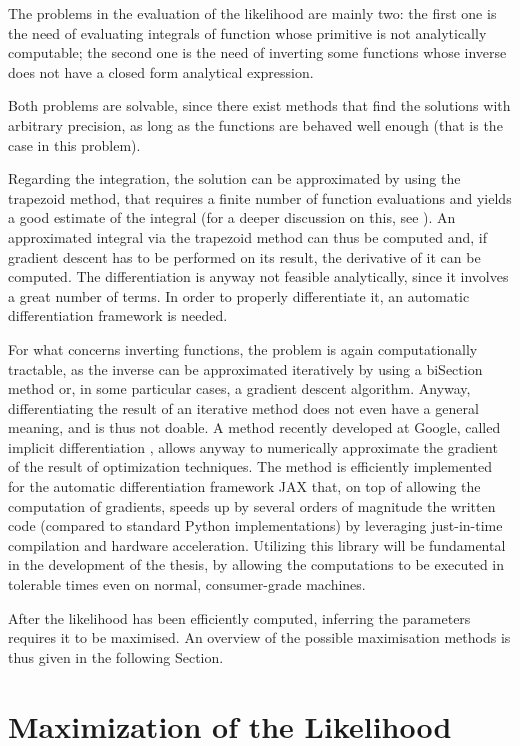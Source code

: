 The problems in the evaluation of the likelihood are mainly two:
the first one is the need of evaluating integrals of function whose primitive is not analytically computable;
the second one is the need of inverting some functions whose inverse does not have a closed form analytical expression.

Both problems are solvable,
since there exist methods that find the solutions with arbitrary precision,
as long as the functions are behaved well enough (that is the case in this problem).

Regarding the integration, the solution can be approximated by using the trapezoid method,
that requires a finite number of function evaluations and yields a good estimate of the integral
(for a deeper discussion on this, see \cite{Sueli_Mayers_2003}).
An approximated integral via the trapezoid method can thus be computed and,
if gradient descent has to be performed on its result,
the derivative of it can be computed.
The differentiation is anyway not feasible analytically, since it involves a great number of terms.
In order to properly differentiate it,
an automatic differentiation framework is needed.

For what concerns inverting functions, the problem is again computationally tractable,
as the inverse can be approximated iteratively by using a biSection method or,
in some particular cases, a gradient descent algorithm.
Anyway, differentiating the result of an iterative method does not even have a general meaning,
and is thus not doable.
A method recently developed at Google,
called implicit differentiation \parencite{DBLP:journals/corr/abs-2105-15183},
allows anyway to numerically approximate the gradient of the result of optimization techniques.
The method is efficiently implemented for the automatic differentiation framework JAX \parencite{jax2018github}
that, on top of allowing the computation of gradients,
speeds up by several orders of magnitude the written code (compared to standard Python implementations)
by leveraging just-in-time compilation and hardware acceleration.
Utilizing this library will be fundamental in the development of the thesis,
by allowing the computations to be executed in tolerable times even on normal, consumer-grade machines.

After the likelihood has been efficiently computed,
inferring the parameters requires it to be maximised.
An overview of the possible maximisation methods is thus given in the following Section.

\section{Maximization of the Likelihood}
\label{sec:max_lik_meth}

